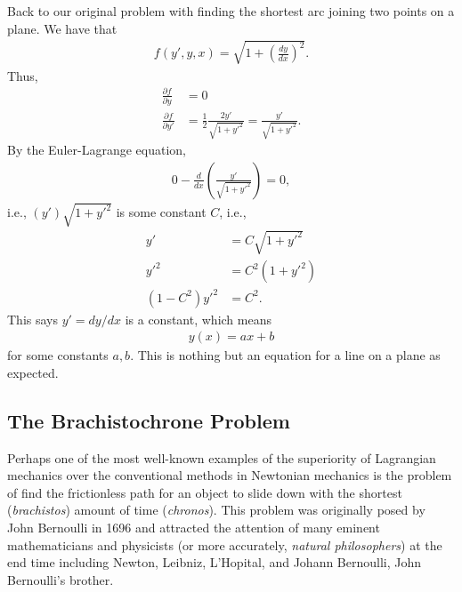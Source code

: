 \documentclass{article}
\newcommand{\p}{\partial}
\newcommand{\f}[2]{\frac{#1}{#2}}
\newcommand{\lp}{\left(}
\newcommand{\rp}{\right)}
\begin{document}
Back to our original problem with finding the shortest arc joining two points on a plane. We have that
\begin{align}
f(y',y,x) = \sqrt{1 + \lp\f{dy}{dx}\rp^2}.
\end{align}
Thus,
\begin{align}
\f{\p f}{\p y} &= 0\\
\f{\p f}{\p y'} &= \f{1}{2}\f{2y'}{\sqrt{1 + y'^2}} = \f{y'}{\sqrt{1 + y'^2}}.
\end{align}
By the Euler-Lagrange equation, 
\begin{align}
0 - \f{d}{dx}\lp \f{y'}{\sqrt{1 + y'^2}} \rp = 0,
\end{align}
i.e., $(y')\sqrt{1 + y'^2}$ is some constant $C$, i.e.,
\begin{align}
y' &= C\sqrt{1 + y'^2}\nonumber\\
y'^2 &= C^2(1+y'^2)\nonumber\\
(1 - C^2)y'^2 &= C^2.
\end{align} 
This says $y' = dy/dx$ is a constant, which means 
\begin{align}
y(x) = ax + b
\end{align} 
for some constants $a,b$. This is nothing but an equation for a line on a plane as expected.

\subsection{The Brachistochrone Problem}

Perhaps one of the most well-known examples of the superiority of Lagrangian mechanics over the conventional methods in Newtonian mechanics is the problem of find the frictionless path for an object to slide down with the shortest (\textit{brachistos}) amount of time (\textit{chronos}). This problem was originally posed by John Bernoulli in 1696 and attracted the attention of many eminent mathematicians and physicists (or more accurately, \textit{natural philosophers}) at the end time including Newton, Leibniz, L'Hopital, and Johann Bernoulli, John Bernoulli's brother. 
\end{document}
